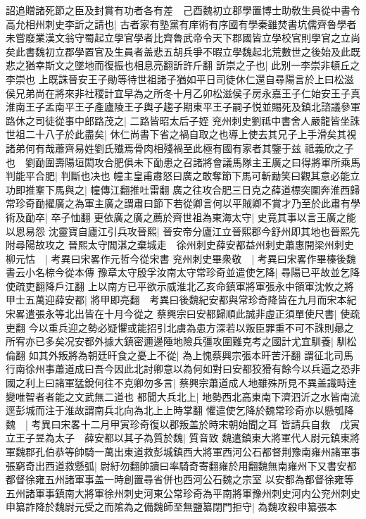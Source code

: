 詔追贈諸死節之臣及封賞有功者各有差　己酉魏初立郡學置博士助敎生員從中書令高允相州刺史李訢之請也|{
	古者家有塾黨有庠術有序國有學秦雖焚書坑儒齊魯學者未嘗廢業漢文翁守蜀起立學官學者比齊魯武帝令天下郡國皆立學校官則學官之立尚矣此書魏初立郡學置官及生員者盖悲五胡兵爭不暇立學魏起北荒數世之後始及此既悲之猶幸斯文之墜地而復振也相息亮翻訢許斤翻}
訢崇之子也|{
	此别一李崇非頓丘之李崇也}
上既誅晉安王子勛等待世祖諸子猶如平日司徒休仁還自尋陽言於上曰松滋侯兄弟尚在將來非社稷計宜早為之所冬十月乙卯松滋侯子房永嘉王子仁始安王子真淮南王子孟南平王子產廬陵王子輿子趨子期東平王子嗣子悦並賜死及鎮北諮議參軍路休之司徒從事中郎路茂之|{
	二路皆昭太后子姪}
兖州刺史劉祗中書舍人嚴龍皆坐誅世祖二十八子於此盡矣|{
	休仁尚書下省之禍自取之也導上使去其兄子上手滑矣其視諸弟何有哉蕭齊易姓劉氏殱焉骨肉相殘禍至此極有國有家者其鑒于兹}
祗義欣之子也　劉勔圍壽陽垣閎攻合肥俱未下勔患之召諸將會議馬隊主王廣之曰得將軍所乘馬判能平合肥|{
	判斷也决也}
幢主皇甫肅怒曰廣之敢奪節下馬可斬勔笑曰觀其意必能立功即推鞌下馬與之|{
	幢傳江翻推吐雷翻}
廣之往攻合肥三日克之薛道標突圍奔淮西歸常珍奇勔擢廣之為軍主廣之謂肅曰節下若從卿言何以平賊卿不賞才乃至於此肅有學術及勔卒|{
	卒子恤翻}
更依廣之廣之薦於齊世祖為東海太守|{
	史竟其事以言王廣之能以恩易怨}
沈靈寶自廬江引兵攻晉熙|{
	晉安帝分廬江立晉熙郡今舒州即其地也晉熙先附尋陽故攻之}
晉熙太守閻湛之棄城走　徐州刺史薛安都益州刺史蕭惠開梁州刺史柳元怙　|{
	考異曰宋畧作元哲今從宋書}
兖州刺史畢衆敬　|{
	考異曰宋畧作畢榛後魏書云小名㮈今從本傳}
豫章太守殷孚汝南太守常珍奇並遣使乞降|{
	尋陽已平故並乞降使疏吏翻降戶江翻}
上以南方已平欲示威淮北乙亥命鎮軍將軍張永中領軍沈攸之將甲士五萬迎薛安都|{
	將甲即亮翻　考異曰後魏紀安都與常珍奇降皆在九月而宋本紀宋畧遣張永等北出皆在十月今從之}
蔡興宗曰安都歸順此誠非虛正須單使尺書|{
	使疏吏翻}
今以重兵迎之勢必疑懼或能招引北虜為患方深若以叛臣罪重不可不誅則曏之所宥亦已多矣况安都外據大鎮密邇邊陲地險兵彊攻圍難克考之國計尤宜馴養|{
	馴松倫翻}
如其外叛將為朝廷旰食之憂上不從|{
	為上愧蔡興宗張本旰苦汗翻}
謂征北司馬行南徐州事蕭道成曰吾今因此北討卿意以為何如對曰安都狡猾有餘今以兵逼之恐非國之利上曰諸軍猛銳何往不克卿勿多言|{
	蔡興宗蕭道成人地雖殊所見不異盖識時逹變唯智者者能之文武無二道也}
都聞大兵北上|{
	地勢西北高東南下濟泗沂之水皆南流逕彭城而注于淮故謂南兵北向為北上上時掌翻}
懼遣使乞降於魏常珍奇亦以懸瓠降魏　|{
	考異曰宋畧十二月甲寅珍奇復以郡叛盖於時宋朝始聞之耳}
皆請兵自救　戊寅立王子昱為太子　薛安都以其子為質於魏|{
	質音致}
魏遣鎮東大將軍代人尉元鎮東將軍魏郡孔伯恭等帥騎一萬出東道救彭城鎮西大將軍西河公石都督荆豫南雍州諸軍事張窮奇出西道救懸弧|{
	尉紆勿翻帥讀曰率騎奇寄翻雍於用翻魏無南雍州下又書安都都督徐雍五州諸軍事盖一時創置尋省併也西河公石魏之宗室}
以安都為都督徐雍等五州諸軍事鎮南大將軍徐州刺史河東公常珍奇為平南將軍豫州刺史河内公兖州刺史申纂詐降於魏尉元受之而隂為之備魏師至無鹽纂閉門拒守|{
	為魏攻殺申纂張本}
